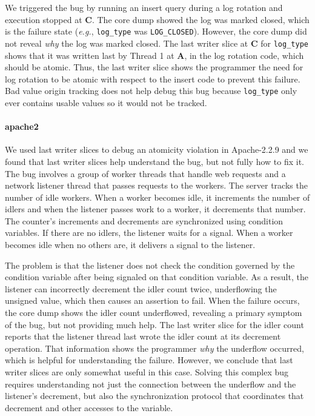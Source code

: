 \documentclass[preprint,9pt]{sigplanconf}
\begin{document}
We triggered the bug by running an insert query during a log rotation and
execution stopped at {\bf C}.  The core dump showed the log was marked closed,
which is the failure state ({\em e.g.}, {\tt log\_type} was {\tt LOG\_CLOSED}).
However, the core dump did not reveal {\em why} the log was marked closed.  The
last writer slice at {\bf C} for {\tt log\_type} shows that it was written last
by Thread 1 at {\bf A}, in the log rotation code, which should be atomic.
Thus, the last writer slice shows the programmer the need for log rotation to
be atomic with respect to the insert code to prevent this failure.  Bad value
origin tracking does not help debug this bug because {\tt log\_type} only ever
contains usable values so it would not be tracked.  

\paragraph{apache2}
We used last writer slices to debug an atomicity violation in Apache-2.2.9 and
we found that last writer slices help understand the bug, but not fully how to fix
it.  The bug involves a group of worker threads that handle web requests and a
network listener thread that passes requests to the workers.  The server tracks
the number of idle workers.  When a worker becomes idle, it increments the
number of idlers and when the listener passes work to a worker, it decrements
that number.  The counter's increments and decrements are synchronized using
condition variables.  If there are no idlers, the listener waits for a signal.
When a worker becomes idle when no others are, it delivers a signal to the
listener.

The problem is that the listener does not check the condition governed by the
condition variable after being signaled on that condition variable.  As a
result, the listener can incorrectly decrement the idler count twice,
underflowing the unsigned value, which then causes an assertion to fail.  When
the failure occurs, the core dump shows the idler count underflowed, revealing
a primary symptom of the bug, but not providing much help.  The last
writer slice for the idler count reports that the listener thread last
wrote the idler count at its decrement operation.  That information shows the programmer
{\em why} the underflow occurred, which is helpful for understanding the
failure.  However, we conclude that last writer slices are only somewhat 
useful in this case.  Solving this complex bug requires understanding not just
the connection between the underflow and the listener's decrement, but also the
synchronization protocol that coordinates that decrement and other accesses to
the variable.  
\end{document}
